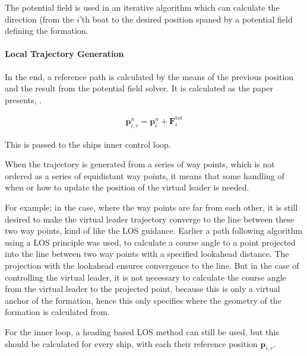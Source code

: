 The potential field is used in an iterative algorithm which can
calculate the direction (from the $i$'th boat to the desired position
spaned by a potential field defining the formation.

\paragraph{Local Trajectory Generation}
In the end, a reference path is calculated by the means of the
previous position and the result from the potential field
solver. It is calculated as the paper presents, \citep[eq.
48]{UAVff3dpf}.

\begin{align}
	\mathbf{p}_{i,r}^n = \mathbf{p}_i^n + \mathbf{F}_i ^\text{tot}
\end{align}

This is passed to the ships inner control loop.

When the trajectory is generated from a series of way points, which is
not ordered as a series of equidistant way points, it means that some
handling of when or how to update the position of the virtual leader
is needed.

For example; in the case, where the way points are far from each
other, it is still desired to make the virtual leader trajectory
converge to the line between these two way points, kind of like the
\ac{LOS} guidance. Earlier a path following algorithm using a \ac{LOS}
principle was used, to calculate a course angle to a point projected
into the line between two way points with a specified lookahead
distance. The projection with the lookahead ensures convergence to the
line. But in the case of controlling the virtual leader, it is not
necessary to calculate the course angle from the virtual leader to the
projected point, because this is only a virtual anchor of the
formation, hence this only specifies where the geometry of the
formation is calculated from. 

For the inner loop, a heading based \ac{LOS} method can still be used,
but this should be calculated for every ship, with each their
reference position $\mathbf{p}_{i,r}$.


